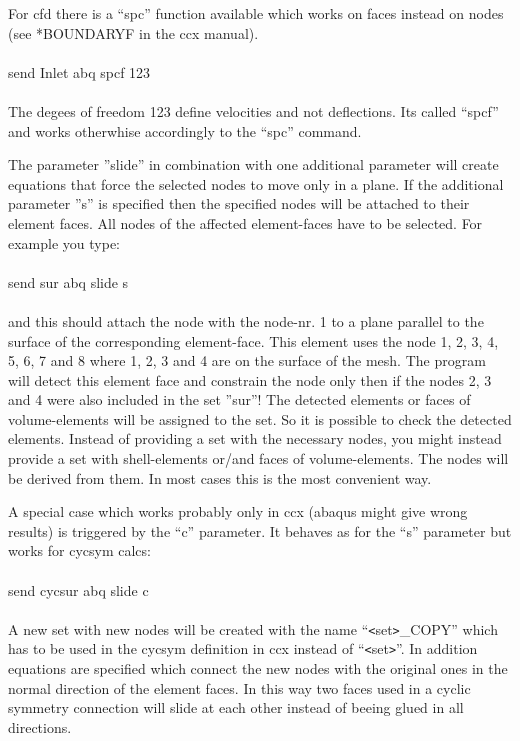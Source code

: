 \documentclass{article}
\begin{document}
For cfd there is a ``spc'' function available which works on faces instead on nodes (see *BOUNDARYF in the ccx manual).\\\\send Inlet abq spcf 123\\\\The degees of freedom 123 define velocities and not deflections. Its called ``spcf'' and works otherwhise accordingly to the ``spc'' command.

The parameter ''slide'' in combination with one additional parameter will create equations that force the selected nodes to move only in a plane. If the additional parameter ''s'' is specified then the specified nodes will be attached to their element faces. All nodes of the affected element-faces have to be selected. For example you type:\\\\send sur abq slide s\\\\and this should attach the node with the node-nr. 1 to a plane parallel to the surface of the corresponding element-face. This element uses the node 1, 2, 3, 4, 5, 6, 7 and 8 where 1, 2, 3 and 4 are on the surface of the mesh. The program will detect this element face and constrain the node only then if the nodes 2, 3 and 4 were also included in the set ''sur''! The detected elements or faces of volume-elements will be assigned to the set. So it is possible to check the detected elements. Instead of providing a set with the necessary nodes, you might instead provide a set with shell-elements or/and faces of volume-elements. The nodes will be derived from them. In most cases this is the most convenient way.

A special case which works probably only in ccx (abaqus might give wrong results) is triggered by the ``c'' parameter. It behaves as for the ``s'' parameter but works for cycsym calcs:\\\\send cycsur abq slide c\\\\ A new set with new nodes will be created with the name ``\verb_<_set\verb_>_\_COPY'' which has to be used in the cycsym definition in ccx instead of ``\verb_<_set\verb_>_''. In addition equations are specified which connect the new nodes with the original ones in the normal direction of the element faces. In this way two faces used in a cyclic symmetry connection will slide at each other instead of beeing glued in all directions. 
\end{document}
